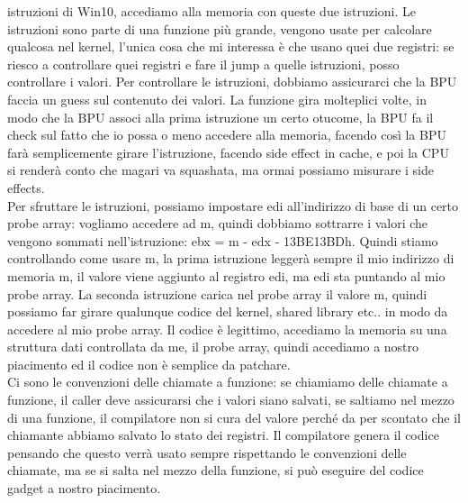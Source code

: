 \documentclass[12pt, oneside]{extbook} %
\begin{document}
istruzioni di Win10, accediamo alla memoria con queste due istruzioni. Le istruzioni sono parte di una funzione più grande, vengono usate per calcolare qualcosa nel kernel, l'unica cosa che mi interessa è che usano quei due registri: se riesco a controllare quei registri e fare il jump a quelle istruzioni, posso controllare i valori. Per controllare le istruzioni, dobbiamo assicurarci che la BPU faccia un guess sul contenuto dei valori. La funzione gira molteplici volte, in modo che la BPU associ alla prima istruzione un certo otucome, la BPU fa il check sul fatto che io possa o meno accedere alla memoria, facendo così la BPU farà semplicemente girare l'istruzione, facendo side effect in cache, e poi la CPU si renderà conto che magari va squashata, ma ormai possiamo misurare i side effects.\\ Per sfruttare le istruzioni, possiamo impostare edi all'indirizzo di base di un certo probe array: vogliamo accedere ad m, quindi dobbiamo sottrarre i valori che vengono sommati nell'istruzione: \textsf{ebx = m - edx - 13BE13BDh}. Quindi stiamo controllando come usare m, la prima istruzione leggerà sempre il mio indirizzo di memoria m, il valore viene aggiunto al registro edi, ma edi sta puntando al mio probe array. La seconda istruzione carica nel probe array il valore m, quindi possiamo far girare qualunque codice del kernel, shared library etc.. in modo da accedere al mio probe array. Il codice è legittimo, accediamo la memoria su una struttura dati controllata da me, il probe array, quindi accediamo a nostro piacimento ed il codice non è semplice da patchare.\\ Ci sono le convenzioni delle chiamate a funzione: se chiamiamo delle chiamate a funzione, il caller deve assicurarsi che i valori siano salvati, se saltiamo nel mezzo di una funzione, il compilatore non si cura del valore perché da per scontato che il chiamante abbiamo salvato lo stato dei registri. Il compilatore genera il codice pensando che questo verrà usato sempre rispettando le convenzioni delle chiamate, ma se si salta nel mezzo della funzione, si può eseguire del codice gadget a nostro piacimento. 
\end{document}
